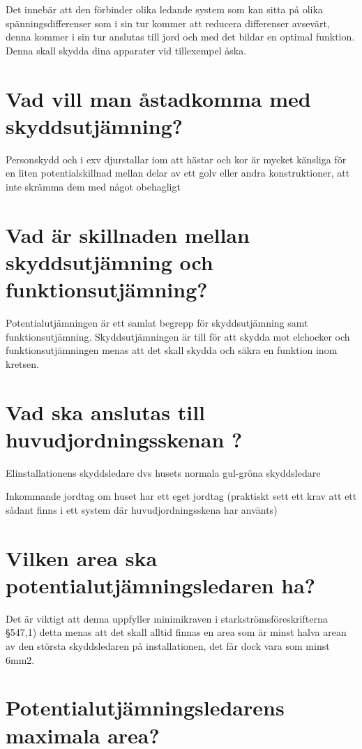 \documentclass[a4paper,swedish]{article}
\begin{document}
Det innebär att den förbinder olika ledande system som kan sitta på olika spänningsdifferenser som i sin tur kommer att reducera differenser avsevärt, denna kommer i sin tur anslutas till jord och med det bildar en optimal funktion. Denna skall skydda dina apparater vid tillexempel åska.

\section{Vad vill man åstadkomma med skyddsutjämning?}\label{sec:skyddsutjamning}

Personskydd och i exv djurstallar iom att hästar och kor är mycket känsliga för en liten potentialskillnad
mellan delar av ett golv eller andra konstruktioner, att inte skrämma dem med något obehagligt

\section{Vad är skillnaden mellan skyddsutjämning och funktionsutjämning?}\label{sec:q_21}

Potentialutjämningen är ett samlat begrepp för skyddsutjämning samt funktionsutjämning.
Skyddsutjämningen är till för att skydda mot elchocker och funktionsutjämningen menas att det skall skydda och säkra en funktion inom kretsen.

\section{Vad ska anslutas till huvudjordningsskenan ?}\label{sec:huvudjordningsskenan}

Elinstallationens skyddsledare dvs husets normala gul-gröna skyddsledare

Inkommande jordtag om huset har ett eget jordtag (praktiskt sett ett krav att ett sådant finns i ett system där huvudjordningsskena har använts)

\section{Vilken area ska potentialutjämningsledaren ha?}
\label{sec:q_23}

Det är viktigt att denna uppfyller minimikraven i starkströmsföreskrifterna §547,1) detta menas att det skall alltid finnas en area som är minst halva arean av den största skyddsledaren på installationen, det får dock vara som minst 6mm2.

\section{Potentialutjämningsledarens maximala area?}\label{sec:potentialutjamningarea}
\end{document}
